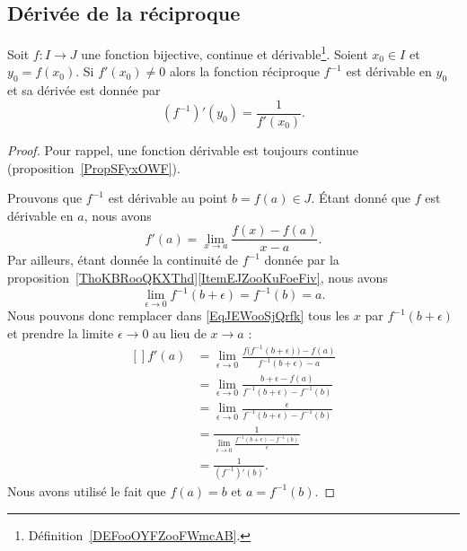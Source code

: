 \subsection{Dérivée de la réciproque}

\begin{proposition} \label{PropMRBooXnnDLq}
	Soit \( f\colon I\to J\) une fonction bijective, continue et dérivable\footnote{Définition~\ref{DEFooOYFZooFWmcAB}.}. Soient \( x_0\in I\) et \( y_0=f(x_0)\). Si \( f'(x_0)\neq 0\) alors la fonction réciproque \( f^{-1}\) est dérivable en \( y_0\) et sa dérivée est donnée par
	\begin{equation}        \label{EQooXGJEooSRaQBe}
		(f^{-1})'(y_0)=\frac{1}{ f'(x_0) }.
	\end{equation}
\end{proposition}

\begin{proof}
	Pour rappel, une fonction dérivable est toujours continue (proposition~\ref{PropSFyxOWF}).

	Prouvons que \( f^{-1}\) est dérivable au point \( b=f(a)\in J\). Étant donné que \( f\) est dérivable en \( a\), nous avons
	\begin{equation}\label{EqJEWooSjQrfk}
		f'(a)=\lim_{x\to a} \frac{ f(x)-f(a) }{ x-a }.
	\end{equation}
	Par ailleurs, étant donnée la continuité de \( f^{-1}\) donnée par la proposition~\ref{ThoKBRooQKXThd}\ref{ItemEJZooKuFoeFiv}, nous avons
	\begin{equation}
		\lim_{\epsilon\to 0} f^{-1}(b+\epsilon)=f^{-1}(b)=a.
	\end{equation}
	Nous pouvons donc remplacer dans \eqref{EqJEWooSjQrfk} tous les \( x\) par \( f^{-1}(b+\epsilon)\) et prendre la limite \( \epsilon\to 0\) au lieu de \( x\to a\) :
	\begin{equation}
		\begin{aligned}[]
			f'(a) & =\lim_{\epsilon\to 0}\frac{ f\big( f^{-1}(b+\epsilon) \big)-f(a) }{ f^{-1}(b+\epsilon)-a } \\
			      & =\lim_{\epsilon\to 0}\frac{ b+\epsilon-f(a) }{ f^{-1}(b+\epsilon)-f^{-1}(b) }              \\
			      & =\lim_{\epsilon\to 0}\frac{ \epsilon }{ f^{-1}(b+\epsilon)-f^{-1}(b) }                     \\
			      & =\frac{1}{ \lim_{\epsilon\to 0}\frac{ f^{-1}(b+\epsilon)-f^{-1}(b) }{ \epsilon } }         \\
			      & =\frac{1}{ (f^{-1})'(b) }.
		\end{aligned}
	\end{equation}
	Nous avons utilisé le fait que \( f(a)=b\) et \( a=f^{-1}(b)\).
\end{proof}

